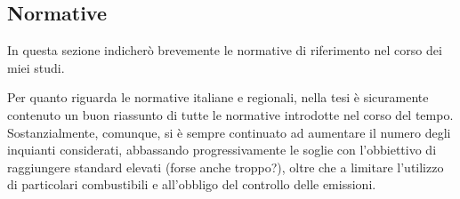 \documentclass{article}
\begin{document}

\subsection{Normative}
\label{subsec:normative}
In questa sezione indicherò brevemente le normative di riferimento nel corso dei miei studi.

Per quanto riguarda le normative italiane e regionali, nella tesi\cite{scolari2017evoluzione} è sicuramente contenuto un buon riassunto di tutte le normative introdotte nel corso del tempo. Sostanzialmente, comunque, si è sempre continuato ad aumentare il numero degli inquianti considerati, abbassando progressivamente le soglie con l'obbiettivo di raggiungere standard elevati (forse anche troppo?), oltre che a limitare l'utilizzo di particolari combustibili e all'obbligo del controllo delle emissioni. 
\end{document}
